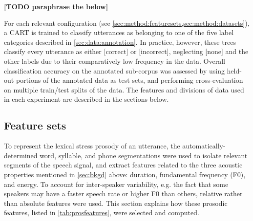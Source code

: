 \documentclass[a4paper]{article}
\newcommand{\TODO}[1]{{\color{red}\textbf{[TODO #1]}}}
\begin{document}
		\TODO{paraphrase the below}

		For each relevant configuration (see \cref{sec:method:featuresets,sec:method:datasets}), a CART is trained to classify utterances as belonging to one of the five label categories described in \cref{sec:data:annotation}. 
		In practice, however, these trees classify every utterance as either [correct] or [incorrect], neglecting [none] and the other labels due to their comparatively low frequency in the data. 
		Overall classification accuracy on the annotated sub-corpus was assessed by using held-out portions of the annotated data as test sets, and performing cross-evaluation on multiple train/test splits of the data. The features and divisions of data used in each experiment are described in the sections below.
	
	
	    \subsection{Feature sets}
	    \label{sec:method:featuresets}
	    
	    To represent the lexical stress prosody of an utterance, the automatically-determined word, syllable, and phone segmentations were used to isolate relevant segments of the speech signal, and extract features related to the three acoustic properties mentioned in \cref{sec:bkgd} above: duration, fundamental frequency (F0), and energy. To account for inter-speaker variability, e.g. the fact that some speakers may have a faster speech rate or higher F0 than others, relative rather than absolute features were used. This section explains how these prosodic features, listed in \cref{tab:prosfeatures}, were selected and computed.
	    
\end{document}
